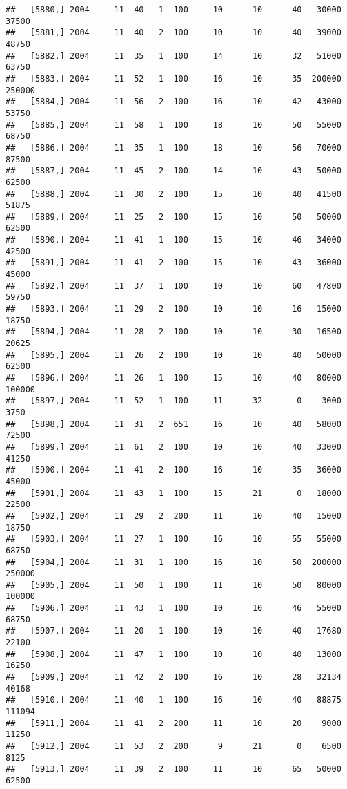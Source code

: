 \documentclass{article}\usepackage[]{graphicx}\usepackage[]{color}
\makeatletter
\newenvironment{kframe}{%
 \def\at@end@of@kframe{}%
 \ifinner\ifhmode%
  \def\at@end@of@kframe{\end{minipage}}%
  \begin{minipage}{\columnwidth}%
 \fi\fi%
 \def\FrameCommand##1{\hskip\@totalleftmargin \hskip-\fboxsep
 \colorbox{shadecolor}{##1}\hskip-\fboxsep
     \hskip-\linewidth \hskip-\@totalleftmargin \hskip\columnwidth}%
 \MakeFramed {\advance\hsize-\width
   \@totalleftmargin\z@ \linewidth\hsize
   \@setminipage}}%
 {\par\unskip\endMakeFramed%
 \at@end@of@kframe}
\newenvironment{knitrout}{}{} %
\makeatother
\begin{document}
\begin{knitrout}
\begin{kframe}
\begin{verbatim}
##   [5880,] 2004     11  40   1  100     10      10      40   30000   37500
##   [5881,] 2004     11  40   2  100     10      10      40   39000   48750
##   [5882,] 2004     11  35   1  100     14      10      32   51000   63750
##   [5883,] 2004     11  52   1  100     16      10      35  200000  250000
##   [5884,] 2004     11  56   2  100     16      10      42   43000   53750
##   [5885,] 2004     11  58   1  100     18      10      50   55000   68750
##   [5886,] 2004     11  35   1  100     18      10      56   70000   87500
##   [5887,] 2004     11  45   2  100     14      10      43   50000   62500
##   [5888,] 2004     11  30   2  100     15      10      40   41500   51875
##   [5889,] 2004     11  25   2  100     15      10      50   50000   62500
##   [5890,] 2004     11  41   1  100     15      10      46   34000   42500
##   [5891,] 2004     11  41   2  100     15      10      43   36000   45000
##   [5892,] 2004     11  37   1  100     10      10      60   47800   59750
##   [5893,] 2004     11  29   2  100     10      10      16   15000   18750
##   [5894,] 2004     11  28   2  100     10      10      30   16500   20625
##   [5895,] 2004     11  26   2  100     10      10      40   50000   62500
##   [5896,] 2004     11  26   1  100     15      10      40   80000  100000
##   [5897,] 2004     11  52   1  100     11      32       0    3000    3750
##   [5898,] 2004     11  31   2  651     16      10      40   58000   72500
##   [5899,] 2004     11  61   2  100     10      10      40   33000   41250
##   [5900,] 2004     11  41   2  100     16      10      35   36000   45000
##   [5901,] 2004     11  43   1  100     15      21       0   18000   22500
##   [5902,] 2004     11  29   2  200     11      10      40   15000   18750
##   [5903,] 2004     11  27   1  100     16      10      55   55000   68750
##   [5904,] 2004     11  31   1  100     16      10      50  200000  250000
##   [5905,] 2004     11  50   1  100     11      10      50   80000  100000
##   [5906,] 2004     11  43   1  100     10      10      46   55000   68750
##   [5907,] 2004     11  20   1  100     10      10      40   17680   22100
##   [5908,] 2004     11  47   1  100     10      10      40   13000   16250
##   [5909,] 2004     11  42   2  100     16      10      28   32134   40168
##   [5910,] 2004     11  40   1  100     16      10      40   88875  111094
##   [5911,] 2004     11  41   2  200     11      10      20    9000   11250
##   [5912,] 2004     11  53   2  200      9      21       0    6500    8125
##   [5913,] 2004     11  39   2  100     11      10      65   50000   62500

\end{verbatim}
\end{kframe}
\end{knitrout}
\end{document}
